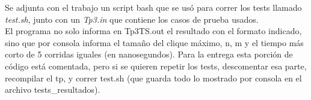 Se adjunta con el trabajo un script bash que se usó para correr los tests llamado \textit{test.sh}, junto con un \textit{Tp3.in} que contiene los casos de prueba usados.\\
El programa no solo informa en Tp3TS.out el resultado con el formato indicado, sino que por consola informa el tamaño del clique máximo, n, m y el tiempo más corto de 5 corridas iguales (en nanosegundos).
Para la entrega esta porción de código está comentada, pero si se quieren repetir los tests, descomentar esa parte, recompilar el tp, y correr test.sh (que guarda todo lo mostrado por consola en 
el archivo tests_resultados).